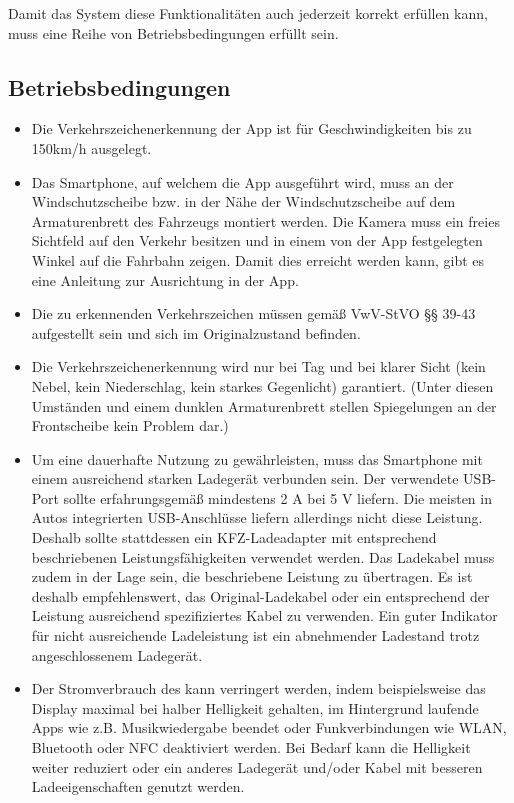 \documentclass[12pt,a4paper,ngerman,enabledeprecatedfontcommands]{scrreprt}
\begin{document}
Damit das \gls{System} diese Funktionalitäten auch jederzeit korrekt erfüllen kann, muss eine Reihe von Betriebsbedingungen erfüllt sein.\\

\subsection{Betriebsbedingungen}
\begin{itemize}

\item Die Verkehrszeichenerkennung der \gls{App} ist für Geschwindigkeiten bis zu 150km/h ausgelegt.

\item Das \gls{Smartphone}, auf welchem die \gls{App} ausgeführt wird, muss an der Windschutzscheibe bzw. in der Nähe der Windschutzscheibe auf dem Armaturenbrett des Fahrzeugs montiert werden. Die Kamera muss ein freies Sichtfeld auf den Verkehr besitzen und in einem von der \gls{App} festgelegten Winkel auf die Fahrbahn zeigen. Damit dies erreicht werden kann, gibt es eine Anleitung zur Ausrichtung in der \gls{App}.

\item Die zu erkennenden Verkehrszeichen müssen gemäß \gls{VwV-StVO} §§ 39-43 aufgestellt sein und sich im Originalzustand befinden.

\item Die Verkehrszeichenerkennung wird nur bei Tag und bei klarer Sicht (kein Nebel, kein Niederschlag, kein starkes Gegenlicht) garantiert. (Unter diesen Umständen und einem dunklen Armaturenbrett stellen Spiegelungen an der Frontscheibe kein Problem dar.)

\item Um eine dauerhafte Nutzung zu gewährleisten, muss das \gls{Smartphone} mit einem ausreichend starken Ladegerät verbunden sein. Der verwendete USB-Port sollte erfahrungsgemäß mindestens 2 A bei 5 V liefern. Die meisten in Autos integrierten USB-Anschlüsse liefern allerdings nicht diese Leistung. Deshalb sollte stattdessen ein KFZ-Ladeadapter mit entsprechend beschriebenen Leistungsfähigkeiten verwendet werden. Das Ladekabel muss zudem in der Lage sein, die beschriebene Leistung zu übertragen. Es ist deshalb empfehlenswert, das Original-Ladekabel oder ein entsprechend der Leistung ausreichend spezifiziertes Kabel zu verwenden. Ein guter Indikator für nicht ausreichende Ladeleistung ist ein abnehmender Ladestand trotz angeschlossenem Ladegerät.

\item Der Stromverbrauch des  kann verringert werden, indem beispielsweise das Display maximal bei halber Helligkeit gehalten, im Hintergrund laufende Apps wie z.B. Musikwiedergabe beendet oder Funkverbindungen wie WLAN, Bluetooth oder NFC deaktiviert werden. Bei Bedarf kann die Helligkeit weiter reduziert oder ein anderes Ladegerät und/oder Kabel mit besseren Ladeeigenschaften genutzt werden.

\end{itemize}
\end{document}
